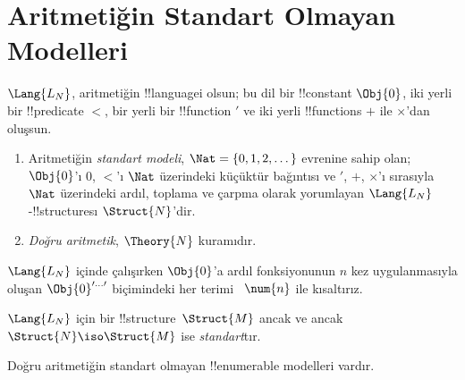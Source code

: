 \documentclass[../../../include/open-logic-section]{subfiles}
\begin{document}
\section{Aritmetiğin Standart Olmayan Modelleri}

\begin{defn}
$\Lang{L_N}$, aritmetiğin !!{language}{}i olsun; bu dil bir !!{constant}
$\Obj{0}$, iki yerli bir !!{predicate} $<$, bir yerli bir !!{function}
$\prime$ ve iki yerli !!{function}s $+$ ile $\times$'dan oluşsun.
\begin{enumerate}
\item Aritmetiğin \emph{standart modeli}, $\Nat = \{ 0, 1, 2, \dots\}$
  evrenine sahip olan; $\Obj{0}$'ı $0$, $<$'ı $\Nat$ üzerindeki küçüktür
  bağıntısı ve $\prime$, $+$, $\times$'ı sırasıyla $\Nat$ üzerindeki ardıl,
  toplama ve çarpma olarak yorumlayan $\Lang{L_N}$-!!{structure}{}sı
  $\Struct{N}$'dir.
\item \emph{Doğru aritmetik}, $\Theory{N}$ kuramıdır.
\end{enumerate}
\end{defn}

$\Lang{L_N}$ içinde çalışırken $\Obj{0}$'a ardıl fonksiyonunun $n$ kez
uygulanmasıyla oluşan $\Obj{0}^{\prime\dots\prime}$ biçimindeki her terimi
~$\num{n}$ ile kısaltırız.

\begin{defn}
$\Lang{L_N}$ için bir !!{structure}~$\Struct{M}$ ancak ve ancak
$\Struct{N} \iso \Struct{M}$ ise \emph{standart}tır.
\end{defn}

\begin{thm}
Doğru aritmetiğin standart olmayan !!{enumerable} modelleri vardır.
\end{thm}
\end{document}
